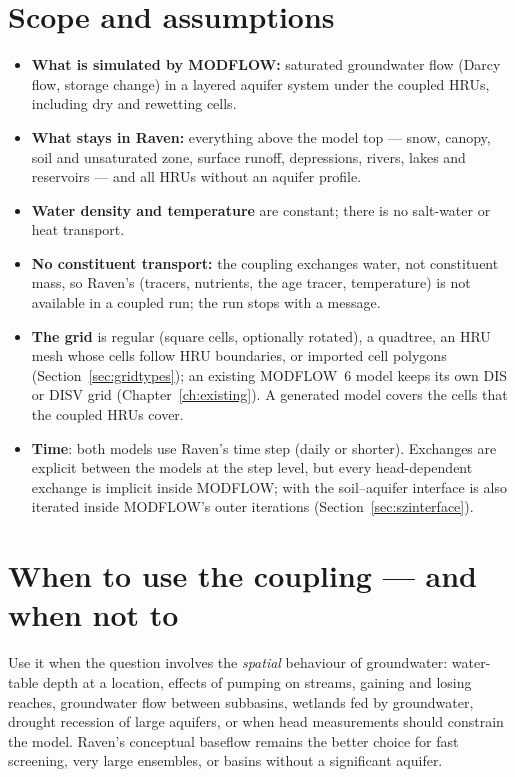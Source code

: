 \section{Scope and assumptions}
\begin{itemize}
\item \textbf{What is simulated by MODFLOW:} saturated groundwater flow (Darcy flow, storage change) in a layered aquifer
system under the coupled HRUs, including dry and rewetting cells.
\item \textbf{What stays in Raven:} everything above the model top --- snow, canopy, soil and unsaturated zone, surface
runoff, depressions, rivers, lakes and reservoirs --- and all HRUs without an aquifer profile.
\item \textbf{Water density and temperature} are constant; there is no salt-water or heat transport.
\item \textbf{No constituent transport:} the coupling exchanges water, not constituent mass, so Raven's 
(tracers, nutrients, the age tracer, temperature) is not available in a coupled run; the run stops with a message.
\item \textbf{The grid} is regular (square cells, optionally rotated), a quadtree, an HRU mesh whose cells follow HRU
boundaries, or imported cell polygons (Section~\ref{sec:gridtypes}); an existing MODFLOW~6 model keeps its own DIS or DISV
grid (Chapter~\ref{ch:existing}). A generated model covers the cells that the coupled HRUs cover.
\item \textbf{Time}: both models use Raven's time step (daily or shorter). Exchanges are explicit between the models at
the step level, but every head-dependent exchange is implicit inside MODFLOW; with  the
soil--aquifer interface is also iterated inside MODFLOW's outer iterations (Section~\ref{sec:szinterface}).
\end{itemize}

\section{When to use the coupling --- and when not to}
Use it when the question involves the \emph{spatial} behaviour of groundwater: water-table depth at a location, effects of
pumping on streams, gaining and losing reaches, groundwater flow between subbasins, wetlands fed by groundwater, drought
recession of large aquifers, or when head measurements should constrain the model. Raven's conceptual baseflow remains the
better choice for fast screening, very large ensembles, or basins without a significant aquifer.

